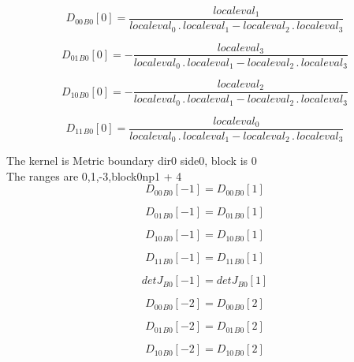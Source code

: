 \documentclass{article}
\begin{document}
\begin{dmath}{D_{00}{_{B0}}}[{0}] = \frac{localeval_{1}}{localeval_{0} \,.\, localeval_{1} - localeval_{2} \,.\, localeval_{3}}\end{dmath}

\begin{dmath}{D_{01}{_{B0}}}[{0}] = - \frac{localeval_{3}}{localeval_{0} \,.\, localeval_{1} - localeval_{2} \,.\, localeval_{3}}\end{dmath}

\begin{dmath}{D_{10}{_{B0}}}[{0}] = - \frac{localeval_{2}}{localeval_{0} \,.\, localeval_{1} - localeval_{2} \,.\, localeval_{3}}\end{dmath}

\begin{dmath}{D_{11}{_{B0}}}[{0}] = \frac{localeval_{0}}{localeval_{0} \,.\, localeval_{1} - localeval_{2} \,.\, localeval_{3}}\end{dmath}

\noindent The kernel is Metric boundary dir0 side0, block is 0\\\noindent The ranges are 0,1,-3,block0np1 + 4\\\begin{dmath}{D_{00}{_{B0}}}[{-1}] = {D_{00}{_{B0}}}[{1}]\end{dmath}

\begin{dmath}{D_{01}{_{B0}}}[{-1}] = {D_{01}{_{B0}}}[{1}]\end{dmath}

\begin{dmath}{D_{10}{_{B0}}}[{-1}] = {D_{10}{_{B0}}}[{1}]\end{dmath}

\begin{dmath}{D_{11}{_{B0}}}[{-1}] = {D_{11}{_{B0}}}[{1}]\end{dmath}

\begin{dmath}{detJ{_{B0}}}[{-1}] = {detJ{_{B0}}}[{1}]\end{dmath}

\begin{dmath}{D_{00}{_{B0}}}[{-2}] = {D_{00}{_{B0}}}[{2}]\end{dmath}

\begin{dmath}{D_{01}{_{B0}}}[{-2}] = {D_{01}{_{B0}}}[{2}]\end{dmath}

\begin{dmath}{D_{10}{_{B0}}}[{-2}] = {D_{10}{_{B0}}}[{2}]\end{dmath}
\end{document}

